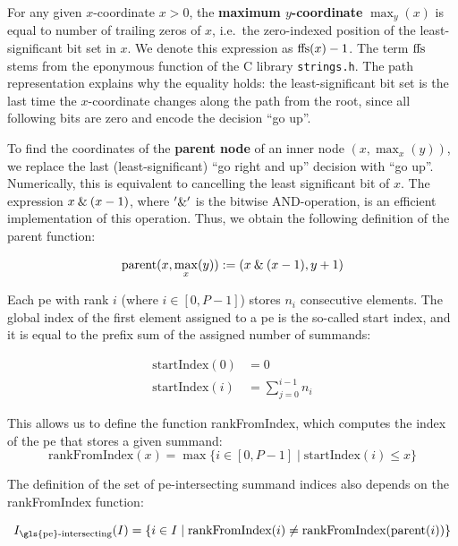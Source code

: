 For any given $x$-coordinate $x > 0$, the \textbf{maximum $y$-coordinate} $\max_y(x)$ is equal to number of trailing zeros of $x$, i.e.\ the zero-indexed position of the least-significant bit set in $x$.
We denote this expression as $\textrm{ffs} (x) - 1$.
The term $\textrm{ffs}$ stems from the eponymous function of the C library \texttt{strings.h}.
The path representation explains why the equality holds: the least-significant bit set is the last time the $x$-coordinate changes along the path from the root, since all following bits are zero and encode the decision \enquote{go up}.

To find the coordinates of the \textbf{parent node} of an inner node $(x, \max_x(y))$, we replace the last (least-significant) \enquote{go right and up} decision with \enquote{go up}. 
Numerically, this is equivalent to cancelling the least significant bit of $x$.
The expression $x \mathbin{\&} (x - 1)$, where $'\mathbin{\&}'$ is the bitwise AND-operation, is an efficient implementation of this operation.
Thus, we obtain the following definition of the parent function:

\begin{equation}
\label{eq:parent}
\textrm{parent} (x, \max_x (y) ) := (x \mathbin{\&} (x - 1), y + 1)
\end{equation}

Each \gls{pe} with rank $i$ (where $i \in [0, P - 1]$) stores $n_i$ consecutive elements.
The global index of the first element assigned to a \gls{pe} is the so-called start index, and it is equal to the prefix sum of the assigned number of summands:

\begin{align}
\textrm{startIndex} (0) &= 0 \\
\textrm{startIndex} (i) &= \sum_{j = 0}^{i - 1} n_i
\label{eq:startIndex}
\end{align}

This allows us to define the function rankFromIndex, which computes the index of the \gls{pe} that stores a given summand:
\begin{equation}
\textrm{rankFromIndex} (x) = \max \{i \in [0, P - 1] \;|\; \textrm{startIndex} (i) \leq x \}
\end{equation}

The definition of the set of \gls{pe}-intersecting summand indices also depends on the rankFromIndex function:

\newcommand{\rankIntersectingIndices}{I_{\textrm{\gls{pe}-intersecting}}}
\begin{equation}
\rankIntersectingIndices (I) = \{i \in I \;|\; \textrm{rankFromIndex} (i) \neq \textrm{rankFromIndex} (\textrm{parent} (i)) \}
\end{equation}

